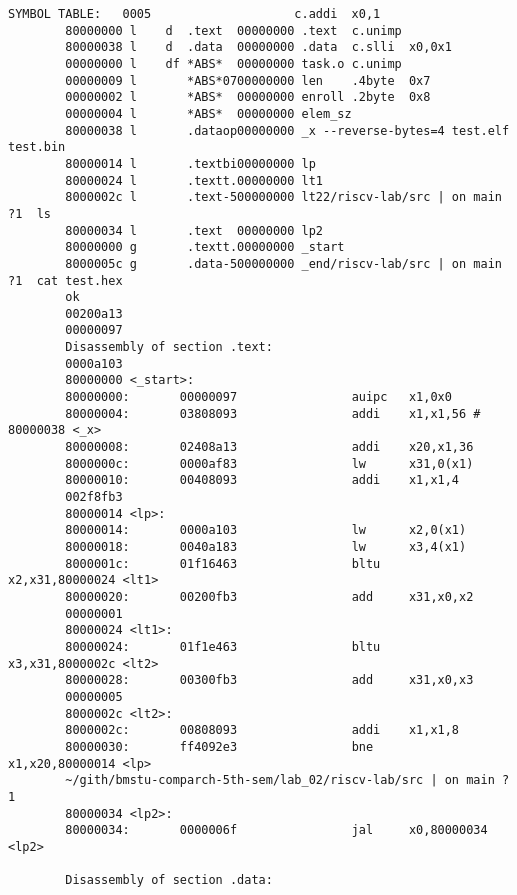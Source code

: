 \begin{lstlisting}[style=asm, caption=Дизассемблированный код программы для задания 1, label=lst:task1_disasm]
        SYMBOL TABLE:   0005                    c.addi  x0,1
        80000000 l    d  .text  00000000 .text  c.unimp
        80000038 l    d  .data  00000000 .data  c.slli  x0,0x1
        00000000 l    df *ABS*  00000000 task.o c.unimp
        00000009 l       *ABS*0700000000 len    .4byte  0x7
        00000002 l       *ABS*  00000000 enroll .2byte  0x8
        00000004 l       *ABS*  00000000 elem_sz
        80000038 l       .dataop00000000 _x --reverse-bytes=4 test.elf test.bin
        80000014 l       .textbi00000000 lp
        80000024 l       .textt.00000000 lt1
        8000002c l       .text-500000000 lt22/riscv-lab/src | on main ?1  ls
        80000034 l       .text  00000000 lp2
        80000000 g       .textt.00000000 _start
        8000005c g       .data-500000000 _end/riscv-lab/src | on main ?1  cat test.hex
        ok
        00200a13
        00000097
        Disassembly of section .text:
        0000a103
        80000000 <_start>:
        80000000:       00000097                auipc   x1,0x0
        80000004:       03808093                addi    x1,x1,56 # 80000038 <_x>
        80000008:       02408a13                addi    x20,x1,36
        8000000c:       0000af83                lw      x31,0(x1)
        80000010:       00408093                addi    x1,x1,4
        002f8fb3
        80000014 <lp>:
        80000014:       0000a103                lw      x2,0(x1)
        80000018:       0040a183                lw      x3,4(x1)
        8000001c:       01f16463                bltu    x2,x31,80000024 <lt1>
        80000020:       00200fb3                add     x31,x0,x2
        00000001
        80000024 <lt1>:
        80000024:       01f1e463                bltu    x3,x31,8000002c <lt2>
        80000028:       00300fb3                add     x31,x0,x3
        00000005
        8000002c <lt2>:
        8000002c:       00808093                addi    x1,x1,8
        80000030:       ff4092e3                bne     x1,x20,80000014 <lp>
        ~/gith/bmstu-comparch-5th-sem/lab_02/riscv-lab/src | on main ?1
        80000034 <lp2>:
        80000034:       0000006f                jal     x0,80000034 <lp2>

        Disassembly of section .data:


\end{lstlisting}
